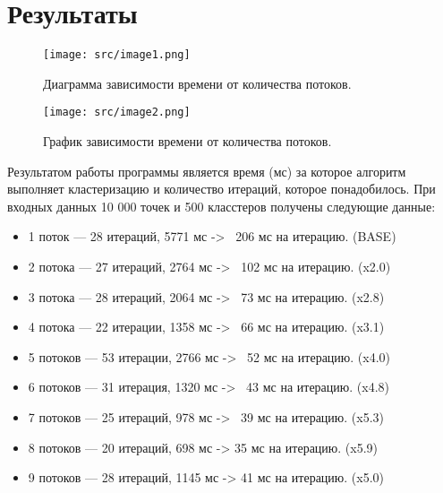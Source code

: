\section{Результаты}

\begin{figure}[H]
    \centering
    \texttt{[image: src/image1.png]}
    \caption{Диаграмма зависимости времени от количества потоков.}
    \label{fig:diagram}
\end{figure}

\begin{figure}[H]
    \centering
    \texttt{[image: src/image2.png]}
    \caption{График зависимости времени от количества потоков.}
    \label{fig:graph}
\end{figure}


Результатом работы программы является время (мс) за которое алгоритм выполняет кластеризацию и количество итераций, которое понадобилось.
При входных данных 10 000 точек и 500 класстеров получены следующие данные:
\begin{itemize}
\item 1 поток --- 28 итераций, 5771 мс -> ~206 мс на итерацию. (BASE)
\item 2 потока --- 27 итераций, 2764 мс -> ~102 мс на итерацию. (x2.0)
\item 3 потока --- 28 итераций, 2064 мс -> ~73 мс на итерацию. (x2.8)
\item 4 потока --- 22 итерации, 1358 мс -> ~66 мс на итерацию. (x3.1)
\item 5 потоков --- 53 итерации, 2766 мс -> ~52 мс на итерацию. (x4.0)
\item 6 потоков --- 31 итерация, 1320 мс -> ~43 мс на итерацию. (x4.8)
\item 7 потоков --- 25 итераций, 978 мс -> ~39 мс на итерацию. (x5.3)
\item 8 потоков --- 20 итераций, 698 мс -> 35 мс на итерацию. (x5.9)
\item 9 потоков --- 28 итераций, 1145 мс -> 41 мс на итерацию. (x5.0)
\end{itemize}

